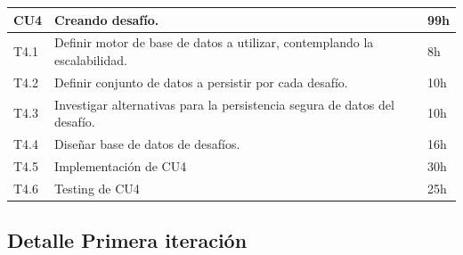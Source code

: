\documentclass[a4paper, 10pt, twoside]{article}
\begin{document}
\vspace{1em}

\begin{tabular}{lp{13cm}l}
  \hline
  CU4 & Creando desafío. & 99h \\
  \hline
  T4.1 & Definir motor de base de datos a utilizar, contemplando la escalabilidad. & 8h \\
  T4.2 & Definir conjunto de datos a persistir por cada desafío. & 10h \\
  T4.3 & Investigar alternativas para la persistencia segura de datos del desafío. & 10h \\
  T4.4 & Diseñar base de datos de desafíos. & 16h \\
  T4.5 & Implementación de CU4 & 30h\\
  T4.6 & Testing de CU4 & 25h\\
  \hline
\end{tabular}


\subsection{Detalle Primera iteración}
\end{document}

